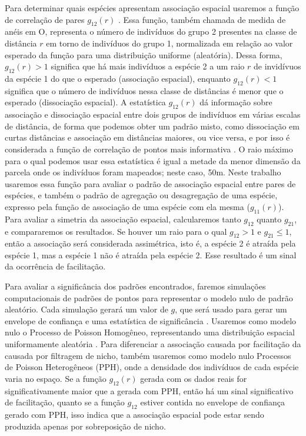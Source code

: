 \documentclass[twoside,12pt,a4paper]{report}
\begin{document}
Para determinar quais espécies apresentam associação espacial usaremos a função de correlação
de pares
$g_{12}(r)$ \citep{IllianBook,WiegandBook,Stoyan1994,spatstatBook}. Essa função, também chamada de medida de
anéis em O, representa o número de indivíduos do grupo 2 presentes na classe de distância $r$ em
torno de indivíduos do grupo 1, normalizada em relação ao valor esperado da função para uma
distribuição uniforme (aleatória). Dessa forma, $g_{12}(r) > 1$ significa que há mais indivíduos a
espécie 2 a um raio $r$ de invidívuos da espécie 1 do que o esperado (associação espacial),
enquanto $g_{12}(r) < 1 $ significa que o número de indivíduos nessa classe de distâncias é menor
que o esperado (dissociação espacial). A estatística $g_{12}(r)$ dá informação sobre associação e dissociação espacial
entre dois grupos de indivíduos em várias escalas de distância, de forma que podemos obter um padrão
misto, como dissociação em curtas distâncias e associação em distâncias maiores, ou vice
versa, e por isso é considerada a função de correlação de pontos mais informativa \citep{IllianBook}. O
raio máximo para o qual podemos usar essa estatística é igual a metade da menor dimensão da parcela
onde os indivíduos foram mapeados; neste caso, 50m. Neste trabalho usaremos essa
função para avaliar o padrão de associação espacial entre pares de espécies, e também o padrão de
agregação ou desagregação de uma espécie, expresso pela função de associação de uma espécie com ela
mesma ($g_{11}(r)$). Para avaliar a simetria da associação espacial, calcularemos tanto
$g_{12}$ quanto $g_{21}$, e compararemos os resultados. Se houver um raio para o qual $g_{12}
>1 $ e $g_{21} \leq 1$, então a associação será considerada assimétrica, isto é, a espécie 2
é atraída pela espécie 1, mas a espécie 1 não é atraída pela espécie 2. Esse resultado é um
sinal da ocorrência de facilitação.

Para avaliar a significância dos padrões encontrados, faremos simulações computacionais de padrões
de pontos para representar o modelo nulo de padrão aleatório. Cada simulação gerará um valor de
$g$, que será usado para gerar um envelope de confiança e uma estatística de significância
\citep{IllianBook,DiggleBook}. Usaremos como modelo nulo o Processo de Poisson Homogêneo,
representando uma distribuição espacial uniformamente aleatória
\citep{refs}. Para diferenciar a associação causada por facilitação da causada por filtragem
de nicho, também usaremos como modelo nulo Processos de Poisson Heterogêneos (PPH), onde a
densidade dos indivíduos de cada espécie varia no espaço. Se a função $g_{12}(r)$ gerada com
os dados reais for
significativamente maior que a gerada com PPH, então há um sinal significativo
de facilitação, quanto se a função $g_{12}$ estiver contida no envelope de confiança gerado
com PPH, isso indica que a associação espacial pode estar sendo produzida apenas por
sobreposição de nicho.
\end{document}

